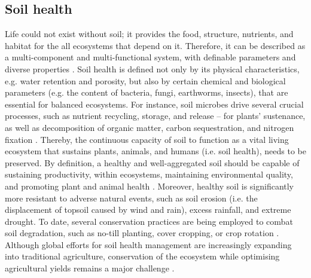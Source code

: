 \subsection{Soil health}
Life could not exist without soil; it provides the food, structure, nutrients, and habitat for the all ecosystems that depend on it.
Therefore, it can be described as a multi-component and multi-functional system, with definable parameters and diverse properties \cite{kibblewhite2007soil}. Soil health is defined not only by its physical characteristics, e.g. water retention and porosity, but also by certain chemical and biological parameters (e.g. the content of bacteria, fungi, earthworms, insects), that are essential for balanced ecosystems.
For instance, soil microbes drive several crucial %
processes, such as nutrient recycling, storage, and release -- for plants' sustenance, as well as decomposition of organic matter, carbon sequestration, and nitrogen fixation \cite{chaparro2012manipulating}. 
Thereby, the continuous capacity of soil to function as a vital living ecosystem that sustains plants, animals, and humans (i.e. soil health), needs to be preserved.  %
By definition, a healthy and well-aggregated soil should be capable of sustaining productivity, within ecosystems, maintaining environmental quality, and promoting plant and animal health \cite{doran1994defining}. Moreover, healthy soil is significantly more resistant to adverse natural events, such as soil erosion (i.e. the displacement of topsoil caused by wind and rain), excess rainfall, and extreme drought. To date, several conservation practices are being employed to combat soil degradation, such as no-till planting, cover cropping, or crop rotation \cite{atkinson2019crop}. Although global efforts for soil health management are increasingly expanding into %
traditional agriculture, conservation of the ecosystem while optimising agricultural yields remains a major challenge \cite{kibblewhite2007soil}. 




